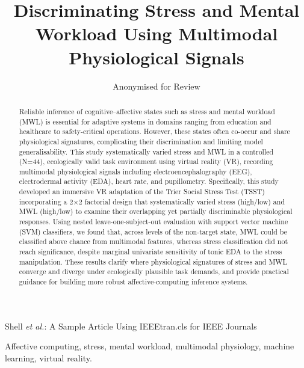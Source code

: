 \documentclass[lettersize,journal]{IEEEtran}
\begin{document}
\title{Discriminating Stress and Mental Workload Using Multimodal Physiological Signals}

\author{Anonymised for Review}

%
{Shell \MakeLowercase{\textit{et al.}}: A Sample Article Using IEEEtran.cls for IEEE Journals}

\maketitle


\begin{abstract}
Reliable inference of cognitive–affective states such as stress and mental workload (MWL) is essential for adaptive systems in domains ranging from education and healthcare to safety-critical operations. However, these states often co-occur and share physiological signatures, complicating their discrimination and limiting model generalisability. This study systematically varied stress and MWL in a controlled (N=44), ecologically valid task environment using virtual reality (VR), recording multimodal physiological signals including electroencephalography (EEG), electrodermal activity (EDA), heart rate, and pupillometry. Specifically, this study developed an immersive VR adaptation of the Trier Social Stress Test (TSST) incorporating a 2×2 factorial design that systematically varied stress (high/low) and MWL (high/low) to examine their overlapping yet partially discriminable physiological responses. Using nested leave-one-subject-out evaluation with support vector machine (SVM) classifiers, we found that, across levels of the non-target state, MWL could be classified above chance from multimodal features, whereas stress classification did not reach significance, despite marginal univariate sensitivity of tonic EDA to the stress manipulation. These results clarify where physiological signatures of stress and MWL converge and diverge under ecologically plausible task demands, and provide practical guidance for building more robust affective-computing inference systems.

\end{abstract}


\begin{IEEEkeywords}
Affective computing, stress, mental workload, multimodal physiology, machine learning, virtual reality.
\end{IEEEkeywords}
\end{document}
